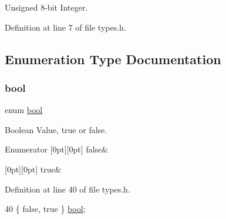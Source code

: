 Unsigned 8-\/bit Integer. 



Definition at line 7 of file types.\+h.



\subsection{Enumeration Type Documentation}
\mbox{\label{a00047_af6a258d8f3ee5206d682d799316314b1_af6a258d8f3ee5206d682d799316314b1}} 
\subsubsection{\texorpdfstring{bool}{bool}}
{\footnotesize\ttfamily enum \hyperlink{a00047_af6a258d8f3ee5206d682d799316314b1_af6a258d8f3ee5206d682d799316314b1}{bool}}



Boolean Value, true or false. 

\begin{DoxyEnumFields}{Enumerator}
[0pt][0pt]{}\mbox{\label{a00047_af6a258d8f3ee5206d682d799316314b1_af6a258d8f3ee5206d682d799316314b1ae9de385ef6fe9bf3360d1038396b884c}} 
false&\\
\hline

[0pt][0pt]{}\mbox{\label{a00047_af6a258d8f3ee5206d682d799316314b1_af6a258d8f3ee5206d682d799316314b1a08f175a5505a10b9ed657defeb050e4b}} 
true&\\
\hline

\end{DoxyEnumFields}


Definition at line 40 of file types.\+h.


\begin{DoxyCode}
40 \{ \textcolor{keyword}{false}, \textcolor{keyword}{true} \} \hyperlink{a00047_af6a258d8f3ee5206d682d799316314b1_af6a258d8f3ee5206d682d799316314b1}{bool};
\end{DoxyCode}

